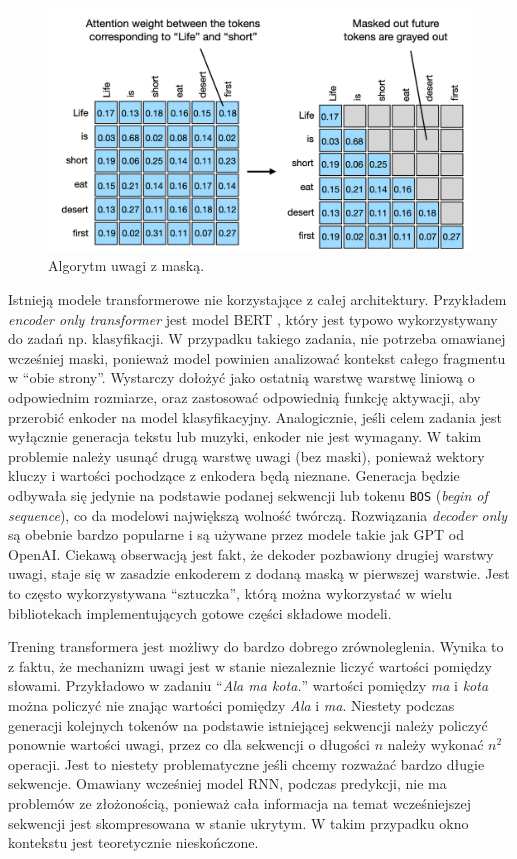 \documentclass[data-science]{agh-wi} %
\begin{document}
\begin{figure}[ht!]
    \begin{center}
        \includegraphics[width=0.9\linewidth]{./img/masked_Att.jpg}
    \end{center}
    \caption{Algorytm uwagi z maską.}\label{fig:masked_attention}
\end{figure}

Istnieją modele transformerowe nie korzystające z całej architektury. Przykładem \textit{encoder only transformer} jest model BERT \cite{bert}, który jest typowo wykorzystywany do zadań np. klasyfikacji. W przypadku takiego zadania, nie potrzeba omawianej wcześniej maski, ponieważ model powinien analizować kontekst całego fragmentu w ``obie strony''. Wystarczy dołożyć jako ostatnią warstwę warstwę liniową o odpowiednim rozmiarze, oraz zastosować odpowiednią funkcję aktywacji, aby przerobić enkoder na model klasyfikacyjny.
Analogicznie, jeśli celem zadania jest wyłącznie generacja tekstu lub muzyki, enkoder nie jest wymagany. W takim problemie należy usunąć drugą warstwę uwagi (bez maski), ponieważ wektory kluczy i wartości pochodzące z enkodera będą nieznane. Generacja będzie odbywała się jedynie na podstawie podanej sekwencji lub tokenu \texttt{BOS} (\textit{begin of sequence}), co da modelowi największą wolność twórczą. Rozwiązania \textit{decoder only} są obebnie bardzo popularne i są używane przez modele takie jak GPT od OpenAI. Ciekawą obserwacją jest fakt, że dekoder pozbawiony drugiej warstwy uwagi, staje się w zasadzie enkoderem z dodaną maską w pierwszej warstwie. Jest to często wykorzystywana ``sztuczka'', którą można wykorzystać w wielu bibliotekach implementujących gotowe części składowe modeli.

Trening transformera jest możliwy do bardzo dobrego zrównoleglenia. Wynika to z faktu, że mechanizm uwagi jest w stanie niezaleznie liczyć wartości pomiędzy słowami. Przykładowo w zadaniu ``\textit{Ala ma kota.}'' wartości pomiędzy \textit{ma} i \textit{kota} można policzyć nie znając wartości pomiędzy \textit{Ala} i \textit{ma}. Niestety podczas generacji kolejnych tokenów na podstawie istniejącej sekwencji należy policzyć ponownie wartości uwagi, przez co dla sekwencji o długości $n$ należy wykonać $n^2$ operacji. Jest to niestety problematyczne jeśli chcemy rozważać bardzo długie sekwencje. Omawiany wcześniej model RNN, podczas predykcji, nie ma problemów ze złożonością, ponieważ cała informacja na temat wcześniejszej sekwencji jest skompresowana w stanie ukrytym. W takim przypadku okno kontekstu jest teoretycznie nieskończone.
\end{document}
